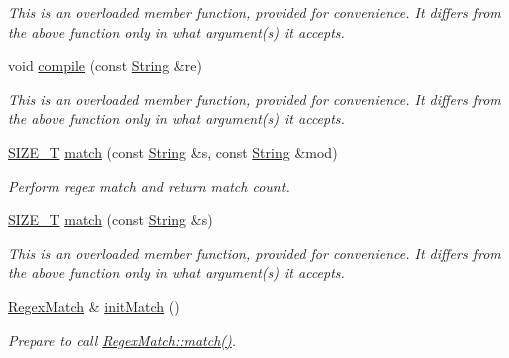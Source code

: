 \begin{DoxyCompactItemize}
\begin{DoxyCompactList}\small\item\em This is an overloaded member function, provided for convenience. It differs from the above function only in what argument(s) it accepts. \end{DoxyCompactList}\item 
void \hyperlink{classjpcre2_1_1Regex_a81687ca434654cae776c2854c3618de0_a81687ca434654cae776c2854c3618de0}{compile} (const \hyperlink{namespacejpcre2_a91f03070152fb228bc116c5a737f1d16}{String} \&re)
\begin{DoxyCompactList}\small\item\em This is an overloaded member function, provided for convenience. It differs from the above function only in what argument(s) it accepts. \end{DoxyCompactList}\item 
\hyperlink{namespacejpcre2_a2aac465ddcb123560c7c8215dd69246c}{S\+I\+Z\+E\+\_\+T} \hyperlink{classjpcre2_1_1Regex_ab93775a93a0a537d09b9e9ab4a5a3894_ab93775a93a0a537d09b9e9ab4a5a3894}{match} (const \hyperlink{namespacejpcre2_a91f03070152fb228bc116c5a737f1d16}{String} \&s, const \hyperlink{namespacejpcre2_a91f03070152fb228bc116c5a737f1d16}{String} \&mod)
\begin{DoxyCompactList}\small\item\em Perform regex match and return match count. \end{DoxyCompactList}\item 
\hyperlink{namespacejpcre2_a2aac465ddcb123560c7c8215dd69246c}{S\+I\+Z\+E\+\_\+T} \hyperlink{classjpcre2_1_1Regex_a9ffbb6aa54cb97125f1b4211bc1d09a5_a9ffbb6aa54cb97125f1b4211bc1d09a5}{match} (const \hyperlink{namespacejpcre2_a91f03070152fb228bc116c5a737f1d16}{String} \&s)
\begin{DoxyCompactList}\small\item\em This is an overloaded member function, provided for convenience. It differs from the above function only in what argument(s) it accepts. \end{DoxyCompactList}\item 
\hyperlink{classjpcre2_1_1RegexMatch}{Regex\+Match} \& \hyperlink{classjpcre2_1_1Regex_a519b0915bf1163c6ce6a4d674b30cfcd_a519b0915bf1163c6ce6a4d674b30cfcd}{init\+Match} ()
\begin{DoxyCompactList}\small\item\em Prepare to call \hyperlink{classjpcre2_1_1RegexMatch_a5868aef3a146594ea1ebef34d122bb33_a5868aef3a146594ea1ebef34d122bb33}{Regex\+Match\+::match()}. \end{DoxyCompactList}\item 

\end{DoxyCompactItemize}
